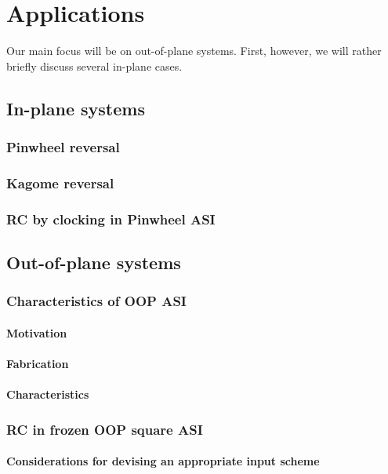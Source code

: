 \chapter{Applications}\label{ch:Applications}

Our main focus will be on out-of-plane systems. First, however, we will rather briefly discuss several in-plane cases.

\section{In-plane systems}
\subsection{Pinwheel reversal}
\subsection{Kagome reversal}
\subsection{RC by clocking in Pinwheel ASI}

\section{Out-of-plane systems}
\subsection{Characteristics of OOP ASI}
\subsubsection{Motivation} %
\subsubsection{Fabrication} %
\subsubsection{Characteristics} %

\subsection{RC in frozen OOP square ASI}
\subsubsection{Considerations for devising an appropriate input scheme}
